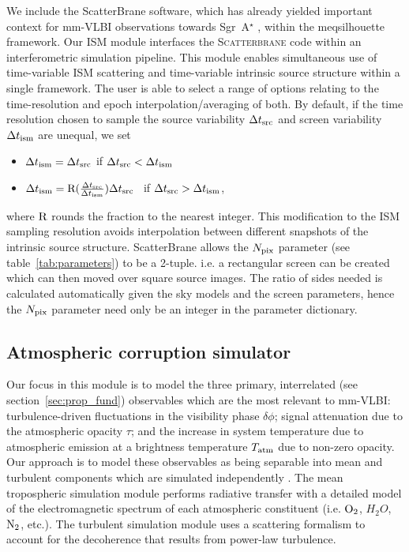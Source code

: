 We include the {\sc ScatterBrane} software, which has already yielded important context for mm-VLBI observations towards Sgr~A$^\star$ \citep[e.g.][]{Ortiz_2016}, within the {\sc meqsilhouette} framework. Our ISM module interfaces the \textsc{Scatterbrane} code within an interferometric simulation pipeline. This module enables simultaneous use of time-variable ISM scattering and time-variable intrinsic source structure within a single framework. The user is able to select a range of options relating to the time-resolution and epoch interpolation/averaging of both. By default, if the time resolution chosen to sample the source variability $\Delta t_{\rm src}$ and screen variability $\Delta t_{\rm ism}$ are unequal, we set  
\begin{itemize}
 \setlength\itemsep{1em}
\item $\Delta t_{\rm ism}=\Delta t_{\rm src}$ \qquad \qquad if \qquad  $\Delta t_{\rm src} < \Delta t_{\rm ism}$
\item $\Delta t_{\rm ism}={\rm R}(\frac{\Delta t_{\rm src}}{\Delta t_{\rm ism}})\Delta t_{\rm src}$ \ if \qquad  $\Delta t_{\rm src} > \Delta t_{\rm ism}$,
\end{itemize}
where ${\rm R}$ rounds the fraction to the nearest integer.  This modification to the ISM sampling resolution avoids interpolation between different snapshots of the intrinsic source structure.  {\sc ScatterBrane} allows the $N_{\rm pix}$ parameter (see table~\ref{tab:parameters}) to be a 2-tuple. i.e. a rectangular screen can be created which can then moved over square source images. The ratio of sides needed is calculated automatically given the sky models and the screen parameters, hence the $N_{\rm pix}$ parameter need only be an integer in the parameter dictionary. 


\subsection{Atmospheric corruption simulator}\label{sec:trop_imp}

Our focus in this module is to model the three primary, interrelated (see section~\ref{sec:prop_fund}) observables which are the most relevant to mm-VLBI: turbulence-driven fluctuations in the visibility phase $\delta \phi$; signal attenuation due to the atmospheric opacity $\tau$; and the increase in system temperature due to atmospheric emission at a brightness temperature $T_{\rm atm}$ due to non-zero opacity. Our approach is to model these observables as being separable into mean and turbulent components which are simulated independently \citep{Blecher_2016}. The mean tropospheric simulation module performs radiative transfer with a detailed model of the electromagnetic spectrum of each atmospheric constituent (i.e. ${\rm O_2}$, {\rm $H_2O$}, ${\rm N_2}$, etc.). The turbulent simulation module uses a scattering formalism to account for the decoherence that results from power-law turbulence.

